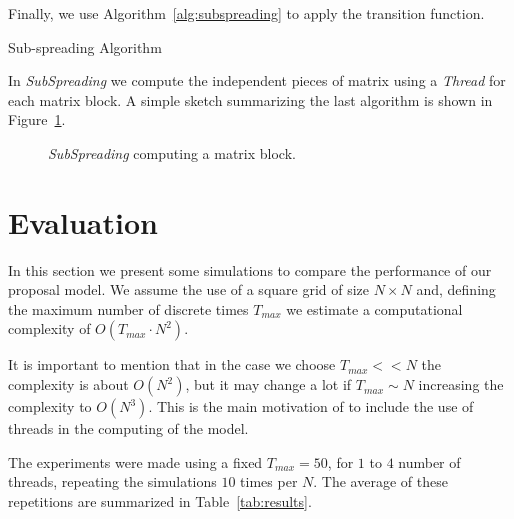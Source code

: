 \documentclass[conference]{IEEEtran}
\begin{document}
        Finally, we use Algorithm~\ref{alg:subspreading} to apply the transition function.
        
        \begin{algorithm}[!ht]
            \begin{algorithmic}
                        \EndFor
                    \EndFor
                \EndProcedure
            \end{algorithmic}
            \caption{Sub-spreading Algorithm}
            \label{alg:subspreading}
        \end{algorithm}
        
        In \emph{SubSpreading} we compute the independent pieces of matrix using a \emph{Thread} for each matrix block.
        A simple sketch summarizing the last algorithm is shown in Figure~\ref{fig:thread}. 
        \begin{figure}
            \centering
            \resizebox{\columnwidth}{!}{
                
            }    
            \caption{\emph{SubSpreading} computing a matrix block.}
            \label{fig:thread}
        \end{figure}
        
        
\section{Evaluation}
    
    In this section we present some simulations to compare the performance of our proposal model.
    We assume the use of a square grid of size $N \times N$ and, defining the maximum number
    of discrete times $T_{max}$ we estimate a computational complexity of $O(T_{max}\cdot N^2)$. 
    
    It is important to mention that in the case we choose $T_{max} << N$ the complexity is about $O(N^2)$,
    but it may change a lot if $T_{max}\sim N$ increasing the complexity to $O(N^3)$. This is the main 
    motivation of to include the use of threads in the computing of the model.
    
    The experiments were made using a fixed $T_{max}=50$, for $1$ to $4$ number of threads, repeating the 
    simulations $10$ times per $N$. The average of these repetitions are summarized in Table~\ref{tab:results}.
    
\end{document}
